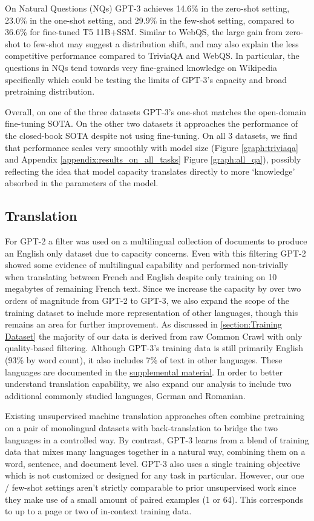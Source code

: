 On Natural Questions (NQs) GPT-3 achieves 14.6\% in the zero-shot setting, 23.0\% in the one-shot setting, and 29.9\% in the few-shot setting, compared to 36.6\% for fine-tuned T5 11B+SSM.  Similar to WebQS, the large gain from zero-shot to few-shot may suggest a distribution shift, and may also explain the less competitive performance compared to TriviaQA and WebQS.  In particular, the questions in NQs tend towards very fine-grained knowledge on Wikipedia specifically which could be testing the limits of GPT-3's capacity and broad pretraining distribution.

Overall, on one of the three datasets GPT-3's one-shot matches the open-domain fine-tuning SOTA. On the other two datasets it approaches the performance of the closed-book SOTA despite not using fine-tuning.  On all 3 datasets, we find that performance scales very smoothly with model size (Figure \ref{graph:triviaqa} and Appendix \ref{appendix:results_on_all_tasks} Figure \ref{graph:all_qa}), possibly reflecting the idea that model capacity translates directly to more ‘knowledge’ absorbed in the parameters of the model.

    \subsection{Translation}
    \label{section:Translation}

For GPT-2 a filter was used on a multilingual collection of documents to produce an English only dataset due to capacity concerns. Even with this filtering GPT-2 showed some evidence of multilingual capability and performed non-trivially when translating between French and English despite only training on 10 megabytes of remaining French text. Since we increase the capacity by over two orders of magnitude from GPT-2 to GPT-3, we also expand the scope of the training dataset to include more representation of other languages, though this remains an area for further improvement. As discussed in \ref{section:Training Dataset} the majority of our data is derived from raw Common Crawl with only quality-based filtering. Although GPT-3's training data is still primarily English (93\% by word count), it also includes 7\% of text in other languages. These languages are documented in the \href{https://github.com/openai/gpt-3}{supplemental material}. In order to better understand translation capability, we also expand our analysis to include two additional commonly studied languages, German and Romanian.

Existing unsupervised machine translation approaches often combine pretraining on a pair of monolingual datasets with back-translation \cite{sennrich2015improving} to bridge the two languages in a controlled way. By contrast, GPT-3 learns from a blend of training data that mixes many languages together in a natural way, combining them on a word, sentence, and document level. GPT-3 also uses a single training objective which is not customized or designed for any task in particular. However, our one / few-shot settings aren't strictly comparable to prior unsupervised work since they make use of a small amount of paired examples (1 or 64). This corresponds to up to a page or two of in-context training data. 

